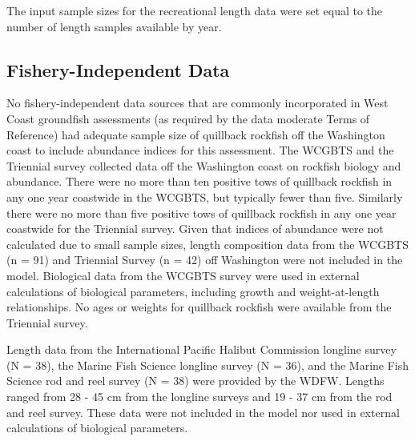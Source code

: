 \documentclass[11pt,
  english,
  a4paper,
]{article}
\begin{document}
\leavevmode\tagmcend\tagstructend\par


The input sample sizes for the recreational length data were set equal to the number of length samples available by year.

\leavevmode\tagmcend\tagstructend\par


\hypertarget{fishery-independent-data}{%
\subsection{Fishery-Independent Data}\label{fishery-independent-data}}

\leavevmode\tagmcend\tagstructend


No fishery-independent data sources that are commonly incorporated in West Coast groundfish assessments (as required by the data moderate Terms of Reference) had adequate sample size of quillback rockfish off the Washington coast to include abundance indices for this assessment. The WCGBTS and the Triennial survey collected data off the Washington coast on rockfish biology and abundance. There were no more than ten positive tows of quillback rockfish in any one year coastwide in the WCGBTS, but typically fewer than five. Similarly there were no more than five positive tows of quillback rockfish in any one year coastwide for the Triennial survey. Given that indices of abundance were not calculated due to small sample sizes, length composition data from the WCGBTS (n = 91) and Triennial Survey (n = 42) off Washington were not included in the model. Biological data from the WCGBTS survey were used in external calculations of biological parameters, including growth and weight-at-length relationships. No ages or weights for quillback rockfish were available from the Triennial survey.

\leavevmode\tagmcend\tagstructend\par


Length data from the International Pacific Halibut Commission longline survey (N = 38), the Marine Fish Science longline survey (N = 36), and the Marine Fish Science rod and reel survey (N = 38) were provided by the WDFW. Lengths ranged from 28 - 45 cm from the longline surveys and 19 - 37 cm from the rod and reel survey. These data were not included in the model nor used in external calculations of biological parameters.
\end{document}
